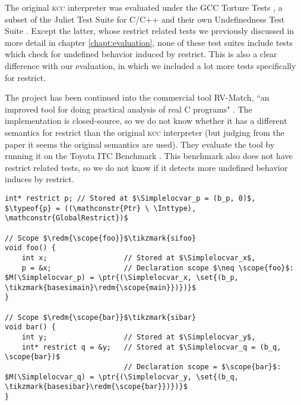 The original \textsc{kcc} interpreter was evaluated under the GCC Torture Tests \cite{ellison2012executable},
a subset of the Juliet Test Suite for C/C++ and their own Undefinedness Test Suite \cite{hathhorn2015defining}.
Except the latter, whose restrict related tests we previously discussed in more detail in chapter \ref{chapt:evaluation},
none of these test suites include tests which check for undefined behavior induced by restrict.
This is also a clear difference with our evaluation, in which we included a lot more tests specifically for restrict.

The \cink{} project has been continued into the commercial tool RV-Match, ``an improved
tool for doing practical analysis of real C programs" \cite{guth2016rv}.
The implementation is closed-source, so we do not know whether it has a different semantics for restrict than
the original \textsc{kcc} interpreter (but judging from the paper it seems the original semantics are used).
They evaluate the tool by running it on the Toyota ITC Benchmark \cite{shiraishi2015test}.
This benchmark also does not have restrict related tests, so we do not know if it detects more undefined behavior induces by restrict.


\begin{code}
\begin{verbatim}
int* restrict p; // Stored at $\Simplelocvar_p = (b_p, 0)$, $\typeof{p} = ((\mathconstr{Ptr} \ \Inttype), \mathconstr{GlobalRestrict})$

// Scope $\redm{\scope{foo}}$\tikzmark{sifoo}
void foo() {
    int x;                  // Stored at $\Simplelocvar_x$,
    p = &x;                 // Declaration scope $\neq \scope{foo}$: $M(\Simplelocvar_p) = \ptr{(\Simplelocvar_x, \set{(b_p, \tikzmark{basesimain}\redm{\scope{main}})})}$
}

// Scope $\redm{\scope{bar}}$\tikzmark{sibar}
void bar() {
    int y;                  // Stored at $\Simplelocvar_y$,
    int* restrict q = &y;   // Stored at $\Simplelocvar_q = (b_q, \scope{bar})$
                            // Declaration scope = $\scope{bar}$: $M(\Simplelocvar_q) = \ptr{(\Simplelocvar_y, \set{(b_q, \tikzmark{basesibar}\redm{\scope{bar}})})}$
}

\end{verbatim}
\label{lst:example-declaration-scopes}
\end{code}


